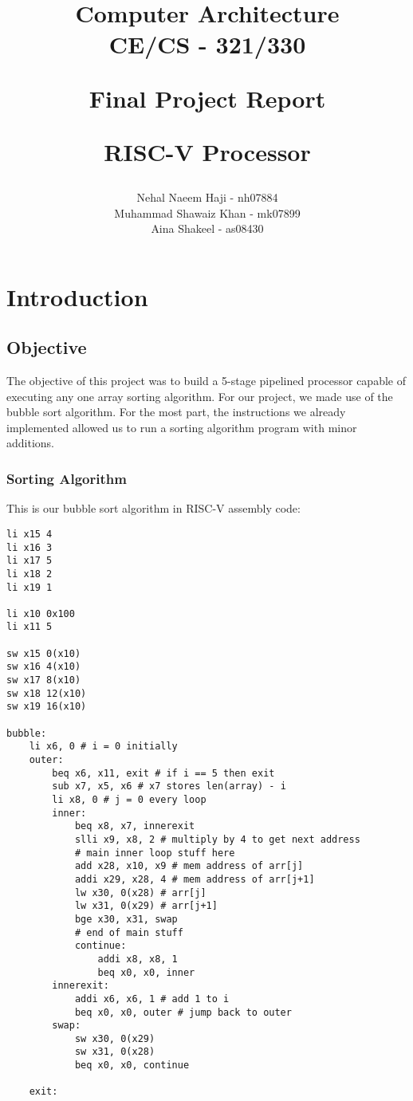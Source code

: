 \documentclass{report}
\title{{\huge \textbf{Computer Architecture \\ CE/CS - 321/330 }}

\vspace*{2mm}
{\LARGE \textbf{Final Project Report}}

{\Large \textbf{RISC-V Processor}} \\
\author{Nehal Naeem Haji - nh07884 \\ Muhammad Shawaiz Khan - mk07899 \\ Aina Shakeel - as08430}}
\begin{document}
\maketitle

\tableofcontents

\chapter{Introduction}
\section{Objective}

The objective of this project was to build a 5-stage pipelined processor capable of executing any one array sorting algorithm. For our project, we made use of the bubble sort algorithm. For the most part, the instructions we already implemented allowed us to run a sorting algorithm program with minor additions. 

\newpage
\subsection{Sorting Algorithm}

This is our bubble sort algorithm in RISC-V assembly code:

\begin{verbatim}
li x15 4
li x16 3
li x17 5
li x18 2
li x19 1

li x10 0x100
li x11 5

sw x15 0(x10)
sw x16 4(x10)
sw x17 8(x10)
sw x18 12(x10)
sw x19 16(x10)

bubble:
    li x6, 0 # i = 0 initially
    outer:
    	beq x6, x11, exit # if i == 5 then exit
        sub x7, x5, x6 # x7 stores len(array) - i
        li x8, 0 # j = 0 every loop
        inner:
        	beq x8, x7, innerexit
            slli x9, x8, 2 # multiply by 4 to get next address
            # main inner loop stuff here
            add x28, x10, x9 # mem address of arr[j]
            addi x29, x28, 4 # mem address of arr[j+1]
            lw x30, 0(x28) # arr[j]
            lw x31, 0(x29) # arr[j+1]
            bge x30, x31, swap
            # end of main stuff
            continue:
                addi x8, x8, 1
                beq x0, x0, inner
       	innerexit:
        	addi x6, x6, 1 # add 1 to i
        	beq x0, x0, outer # jump back to outer
        swap:
        	sw x30, 0(x29)
            sw x31, 0(x28)
            beq x0, x0, continue

	exit:
\end{verbatim}
\end{document}
